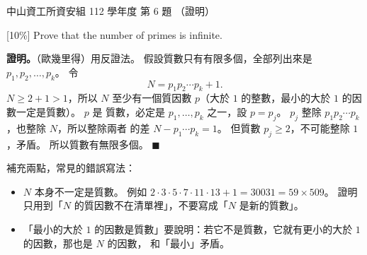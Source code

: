\begin{pastexam}[label={px:nsysu-112-dmalg-06}]{中山資工所資安組 112 學年度 第 6 題}
（證明）

{[10\%]} Prove that the number of primes is infinite.
\end{pastexam}

\begin{pastsoln}
\textbf{證明。}（歐幾里得）用反證法。 假設質數只有有限多個，全部列出來是 $p_1, p_2, \ldots, p_k$。 令
\[
N = p_1 p_2 \cdots p_k + 1.
\]
$N \ge 2 + 1 > 1$，所以 $N$ 至少有一個質因數 $p$（大於 $1$ 的整數，最小的大於 $1$ 的因數一定是質數）。 $p$ 是
質數，必定是 $p_1, \ldots, p_k$ 之一，設 $p = p_j$。 $p_j$ 整除 $p_1 p_2 \cdots p_k$，也整除 $N$，所以整除兩者
的差 $N - p_1 \cdots p_k = 1$。 但質數 $p_j \ge 2$，不可能整除 $1$，矛盾。 所以質數有無限多個。
\hfill$\blacksquare$

補充兩點，常見的錯誤寫法：
\begin{itemize}
\item $N$ 本身不一定是質數。 例如 $2 \cdot 3 \cdot 5 \cdot 7 \cdot 11 \cdot 13 + 1 = 30031 = 59 \times 509$。 證明
只用到「$N$ 的質因數不在清單裡」，不要寫成「$N$ 是新的質數」。
\item 「最小的大於 $1$ 的因數是質數」要說明：若它不是質數，它就有更小的大於 $1$ 的因數，那也是 $N$ 的因數，
和「最小」矛盾。
\end{itemize}
\end{pastsoln}
